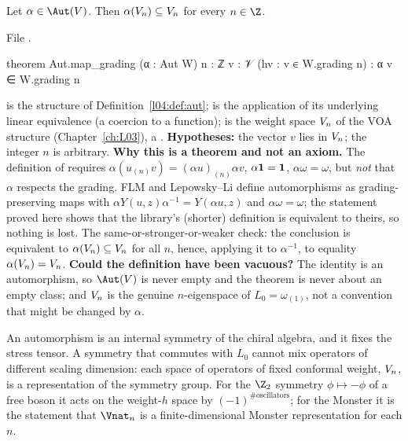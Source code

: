 \begin{theorem}\label{l04:thm:autgrading}
Let $\alpha\in\Aut(\lfourV)$. Then $\alpha(V_n)\subseteq V_n$ for every $n\in\Z$.
\end{theorem}
\noindent File .
\begin{leancode}
theorem Aut.map_grading (α : Aut W) {n : ℤ} {v : 𝒱} (hv : v ∈ W.grading n) :
    α v ∈ W.grading n
\end{leancode}

\begin{dictionary}
 is the structure of Definition~\ref{l04:def:aut};  is the application of its underlying linear
equivalence (a coercion to a function);  is the weight space $V_n$ of the VOA structure
(Chapter~\ref{ch:L03}), a . \textbf{Hypotheses:} the vector $v$ lies in $V_n$; the integer $n$
is arbitrary. \textbf{Why this is a theorem and not an axiom.} The definition of  requires
$\alpha(u_{(n)}v) = (\alpha u)_{(n)}\alpha v$, $\alpha\mathbf{1} = \mathbf{1}$, $\alpha\omega = \omega$, but \emph{not} that
$\alpha$ respects the grading. FLM and Lepowsky--Li define automorphisms as grading-preserving maps with
$\alpha Y(u,z)\alpha^{-1} = Y(\alpha u,z)$ and $\alpha\omega=\omega$; the statement proved here shows that the library's
(shorter) definition is equivalent to theirs, so nothing is lost. The same-or-stronger-or-weaker check: the
conclusion is equivalent to $\alpha(V_n)\subseteq V_n$ for all $n$, hence, applying it to $\alpha^{-1}$, to
equality $\alpha(V_n) = V_n$. \textbf{Could the definition have been vacuous?} The identity is an automorphism, so
$\Aut(\lfourV)$ is never empty and the theorem is never about an empty class; and $V_n$ is the genuine
$n$-eigenspace of $L_0=\omega_{(1)}$, not a convention that might be changed by $\alpha$.
\end{dictionary}

\begin{physics}
An automorphism is an internal symmetry of the chiral algebra, and it fixes the stress tensor. A symmetry that
commutes with $L_0$ cannot mix operators of different scaling dimension: each space of operators of fixed conformal
weight, $V_n$, is a representation of the symmetry group. For the $\Z_2$ symmetry $\phi\mapsto-\phi$ of a free
boson it acts on the weight-$h$ space by $(-1)^{\#\text{oscillators}}$; for the Monster it is the statement that
$\Vnat_n$ is a finite-dimensional Monster representation for each $n$.
\end{physics}

